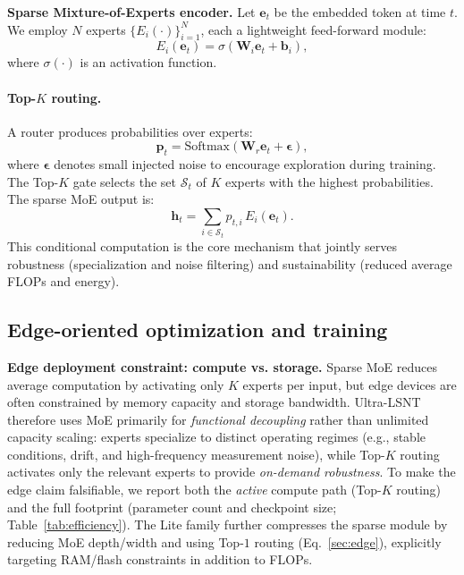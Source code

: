 \documentclass[review,3p,times]{elsarticle}
\begin{document}
\noindent\textbf{Sparse Mixture-of-Experts encoder.}\label{sec:moe}
Let $\mathbf{e}_t$ be the embedded token at time $t$. We employ $N$ experts $\{E_i(\cdot)\}_{i=1}^{N}$, each a lightweight feed-forward module:
\begin{equation}
E_i(\mathbf{e}_t)=\sigma(\mathbf{W}_i\mathbf{e}_t+\mathbf{b}_i),
\end{equation}
where $\sigma(\cdot)$ is an activation function.

\paragraph{Top-$K$ routing.}
A router produces probabilities over experts:
\begin{equation}
\mathbf{p}_t = \text{Softmax}(\mathbf{W}_r\mathbf{e}_t + \boldsymbol{\epsilon}),
\end{equation}
where $\boldsymbol{\epsilon}$ denotes small injected noise to encourage exploration during training. The Top-$K$ gate selects the set $\mathcal{S}_t$ of $K$ experts with the highest probabilities. The sparse MoE output is:
\begin{equation}
\mathbf{h}_t = \sum_{i\in\mathcal{S}_t} p_{t,i}\,E_i(\mathbf{e}_t).
\end{equation}
This conditional computation is the core mechanism that jointly serves robustness (specialization and noise filtering) and sustainability (reduced average FLOPs and energy).


\subsection{Edge-oriented optimization and training}
\label{subsec:method_edge_train}


\noindent\textbf{Edge deployment constraint: compute vs. storage.} Sparse MoE reduces average computation by activating only $K$ experts per input, but edge devices are often constrained by memory capacity and storage bandwidth. Ultra-LSNT therefore uses MoE primarily for \emph{functional decoupling} rather than unlimited capacity scaling: experts specialize to distinct operating regimes (e.g., stable conditions, drift, and high-frequency measurement noise), while Top-$K$ routing activates only the relevant experts to provide \emph{on-demand robustness}. To make the edge claim falsifiable, we report both the \emph{active} compute path (Top-$K$ routing) and the full footprint (parameter count and checkpoint size; Table~\ref{tab:efficiency}). The Lite family further compresses the sparse module by reducing MoE depth/width and using Top-$1$ routing (Eq.~\ref{sec:edge}), explicitly targeting RAM/flash constraints in addition to FLOPs.
\end{document}
